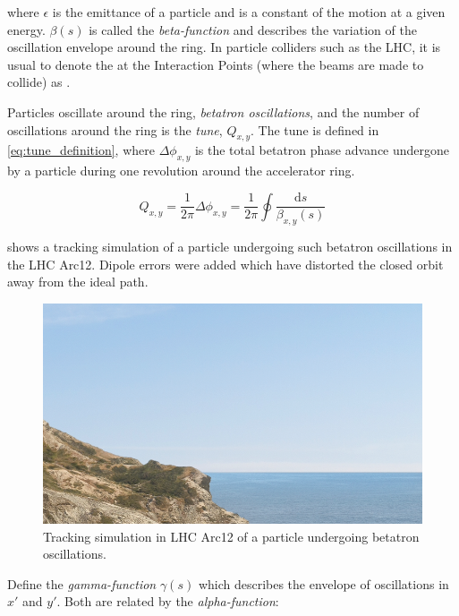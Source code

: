 where $\epsilon$ is the emittance of a particle and is a constant of the motion at a given energy.
$\beta(s)$ is called the \emph{beta-function} and describes the variation of the oscillation envelope around the ring. 
In particle colliders such as the LHC, it is usual to denote the \betafunctions at the Interaction Points (where the beams are made to collide) as \betastar.
\bigbreak

Particles oscillate around the ring, \emph{betatron oscillations}, and the number of oscillations around the ring is the \emph{tune}, $Q_{x,y}$.
The tune is defined in \cref{eq:tune_definition}, where $\Delta \phi_{x, y}$ is the total betatron phase advance undergone by a particle during one revolution around the accelerator ring.
\bigbreak

\begin{equation}
    Q_{x, y} = \frac{1}{2 \pi} \Delta \phi_{x, y} = \frac{1}{2 \pi} \oint \frac{\mathrm{d}s}{\beta_{x, y}(s)}
    \label{eq:tune_definition}
\end{equation}

 shows a tracking simulation of a particle undergoing such betatron oscillations in the LHC Arc12.
Dipole errors were added which have distorted the closed orbit away from the ideal path.
\bigbreak

\begin{figure}[!htb]
    \begin{center}
    \includegraphics[width = 0.7\linewidth]{Figures/placeholder.png}
    \caption{Tracking simulation in LHC Arc12 of a particle undergoing betatron oscillations.}
    \label{fig:particle_trajectories}
    \end{center}
\end{figure}

Define the \emph{gamma-function} $\gamma(s)$ which describes the envelope of oscillations in $x\prime$ and $y\prime$.
Both are related by the \emph{alpha-function}:
\bigbreak

